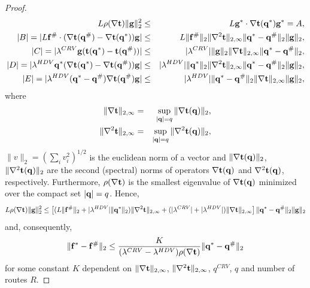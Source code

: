 \documentclass[a4paper,11pt]{article}
\begin{document}
\begin{proof}
\begin{eqnarray*}
L\rho(\nabla \bold{t}) \|\bold{g}\|_2 ^2 &\le& L\bold{g}^* \cdot \nabla \bold{t}(\bold{q}^*) \bold{g^*} = A,\\
|B| = |L\bold{f}^\# \cdot (\nabla \bold{t}(\bold{q}^\#) - \nabla \bold{t}(\bold{q}^*)) \bold{g}| &\le& L \|\bold{f}^\#\|_2 \|\nabla^2 \bold{t}\|_{2,\infty} \|\bold{q}^* - \bold{q}^\#\|_2 \|\bold{g}\|_2, \\
|C| = |\lambda^{CRV} \bold{g}(\bold{t}(\bold{q}^*) - \bold{t}(\bold{q}^\#))| &\le& |\lambda^{CRV}| \|\bold{g}\|_2 \|\nabla \bold{t}\|_{2,\infty} \|\bold{q}^* - \bold{q}^\#\|_2, \\
|D| = |\lambda^{HDV} \bold{q}^*(\nabla \bold{t}(\bold{q}^*) - \nabla \bold{t}(\bold{q}^\#))\bold{g}| &\le& |\lambda^{HDV}|   \|\bold{q}^*\|_2 \|\nabla^2 \bold{t}\|_{2,\infty} \|\bold{q}^* - \bold{q}^\#\|_2 \|\bold{g}\|_2, \\
|E| = |\lambda^{HDV} (\bold{q}^* - \bold{q}^\#) \nabla \bold{t}(\bold{q}^\#) \bold {g}| &\le& |\lambda^{HDV}| \|\bold{q}^* - \bold{q}^\#\|_2 \|\nabla \bold{t}\|_{2,\infty} \|\bold{g}\|_2, 
\end{eqnarray*}
where 
\begin{eqnarray*}
\|\nabla \bold{t}\|_{2,\infty} &=& \sup_{|\bold{q}| = q} \|\nabla \bold{t(\bold{q})}\|_2,  \\
\|\nabla^2 \bold{t}\|_{2,\infty} &=& \sup_{|\bold{q}| = q} \|\nabla^2 \bold{t(\bold{q})}\|_2,
\end{eqnarray*}
$\|v\|_2 = (\sum_i v_i^2)^{1/2}$ is the euclidean norm of a vector and $\|\nabla \bold{t(\bold{q})}\|_2$, $\|\nabla^2 \bold{t(\bold{q})}\|_2$ are the second (spectral) norms of operators $\nabla \bold{t(\bold{q})}$ and $\nabla^2 \bold{t(\bold{q})}$, respectively. Furthermore, $\rho(\nabla \bold{t})$ is the smallest eigenvalue of $\nabla \bold{t}(\bold{q})$ minimized over the compact set $|\bold{q}| = q$. Hence,
\begin{equation*}
L\rho(\nabla \bold{t}) \|\bold{g}\|_2 ^2 \le 
\left[(L\|\bold{f}^\#\|_2 + |\lambda^{HDV}|\|\bold{q}^*\|_2)\|\nabla^2 \bold{t}\|_{2,\infty} + (|\lambda^{CRV}| + |\lambda^{HDV}|)\|\nabla \bold{t}\|_{2,\infty}\right] \|\bold{q}^* - \bold{q}^\#\|_2 \|\bold{g}\|_2  
\end{equation*}
and, consequently,
\begin{equation}
\label{eq_LipC}
\|\bold{f^*} - \bold{f}^\#\|_2 \le \frac K {(\lambda^{CRV} - \lambda^{HDV})\rho(\nabla \bold{t})} \|\bold{q^*} - \bold{q^\#}\|_2
\end{equation}
for some constant $K$ dependent on $\|\nabla \bold{t}\|_{2,\infty}$, $\|\nabla^2 \bold{t}\|_{2,\infty}$, $q^{CRV}$, $q$ and number of routes $R$.  



\end{proof}
\end{document}
